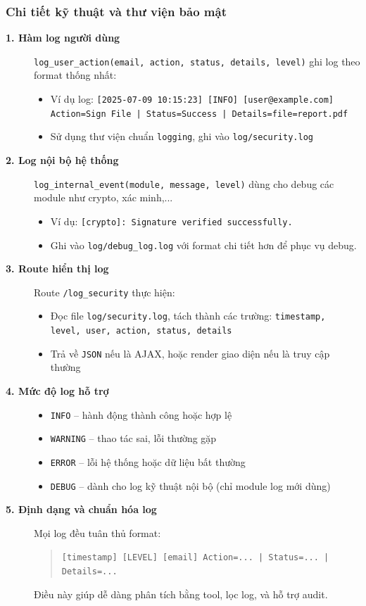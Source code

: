 \subsubsection*{Chi tiết kỹ thuật và thư viện bảo mật}
\begin{description}

    \item[\textbf{1. Hàm log người dùng}]
    \texttt{log\_user\_action(email, action, status, details, level)} ghi log theo format thống nhất:
    \begin{itemize}
        \item Ví dụ log: \texttt{[2025-07-09 10:15:23] [INFO] [user@example.com] Action=Sign File | Status=Success | Details=file=report.pdf}
        \item Sử dụng thư viện chuẩn \texttt{logging}, ghi vào \texttt{log/security.log}
    \end{itemize}

    \item[\textbf{2. Log nội bộ hệ thống}]
    \texttt{log\_internal\_event(module, message, level)} dùng cho debug các module như crypto, xác minh,...
    \begin{itemize}
        \item Ví dụ: \texttt{[crypto]: Signature verified successfully.}
        \item Ghi vào \texttt{log/debug\_log.log} với format chi tiết hơn để phục vụ debug.
    \end{itemize}

    \item[\textbf{3. Route hiển thị log}]
    Route \texttt{/log\_security} thực hiện:
    \begin{itemize}
        \item Đọc file \texttt{log/security.log}, tách thành các trường: \texttt{timestamp, level, user, action, status, details}
        \item Trả về \texttt{JSON} nếu là AJAX, hoặc render giao diện nếu là truy cập thường
    \end{itemize}

    \item[\textbf{4. Mức độ log hỗ trợ}]
    \begin{itemize}
        \item \texttt{INFO} – hành động thành công hoặc hợp lệ
        \item \texttt{WARNING} – thao tác sai, lỗi thường gặp
        \item \texttt{ERROR} – lỗi hệ thống hoặc dữ liệu bất thường
        \item \texttt{DEBUG} – dành cho log kỹ thuật nội bộ (chỉ module log mới dùng)
    \end{itemize}

    \item[\textbf{5. Định dạng và chuẩn hóa log}]
    Mọi log đều tuân thủ format:
    \begin{quote}
        \texttt{[timestamp] [LEVEL] [email] Action=... | Status=... | Details=...}
    \end{quote}
    Điều này giúp dễ dàng phân tích bằng tool, lọc log, và hỗ trợ audit.

\end{description}
